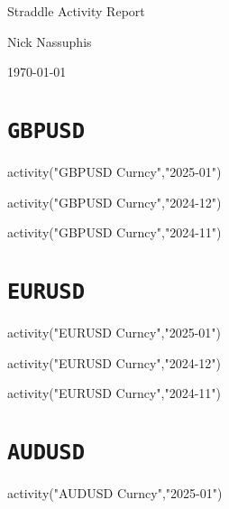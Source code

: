 \documentclass{article}
\begin{document}
\begin{titlepage}
    \centering
    {\Huge Straddle Activity Report\par}
    \vspace{1cm}
    {\Large {} }\par
    \vspace{2cm}
    {\large Nick Nassuphis\par}
    \vspace{1cm}
    {\large \today\par}
\end{titlepage}

\newpage
\tableofcontents  %
\newpage

\section{\texttt{GBPUSD}}

\begin{pycode}
activity("GBPUSD Curncy","2025-01")
\end{pycode}

\begin{pycode}
activity("GBPUSD Curncy","2024-12")
\end{pycode}

\begin{pycode}
activity("GBPUSD Curncy","2024-11")
\end{pycode}

\newpage
\section{\texttt{EURUSD}}

\begin{pycode}
activity("EURUSD Curncy","2025-01")
\end{pycode}

\begin{pycode}
activity("EURUSD Curncy","2024-12")
\end{pycode}

\begin{pycode}
activity("EURUSD Curncy","2024-11")
\end{pycode}

\newpage
\section{\texttt{AUDUSD}}

\begin{pycode}
activity("AUDUSD Curncy","2025-01")
\end{pycode}
\end{document}

